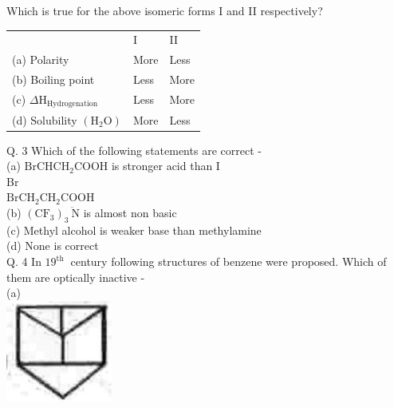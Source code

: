 \documentclass[10pt]{article}
\begin{document}
Which is true for the above isomeric forms I and II respectively?

\begin{center}
\begin{tabular}{lll}
 & I & II \\
(a) Polarity & More & Less \\
(b) Boiling point & Less & More \\
(c) $\Delta \mathrm{H}_{\text {Hydrogenation }}$ & Less & More \\
(d) Solubility $\left(\mathrm{H}_{2} \mathrm{O}\right)$ & More & Less \\
\end{tabular}
\end{center}

Q. 3 Which of the following statements are correct -\\
(a) $\mathrm{BrCHCH}_{2} \mathrm{COOH}$ is stronger acid than I\\
Br\\
$\mathrm{BrCH}_{2} \mathrm{CH}_{2} \mathrm{COOH}$\\
(b) $\left(\mathrm{CF}_{3}\right)_{3} \ddot{\mathrm{~N}}$ is almost non basic\\
(c) Methyl alcohol is weaker base than methylamine\\
(d) None is correct\\
Q. 4 In $19^{\text {th }}$ century following structures of benzene were proposed. Which of them are optically inactive -\\
(a)\\
\includegraphics[max width=\textwidth, center]{2025_01_28_8470952b98110cec3aabg-145}\\
\end{document}
